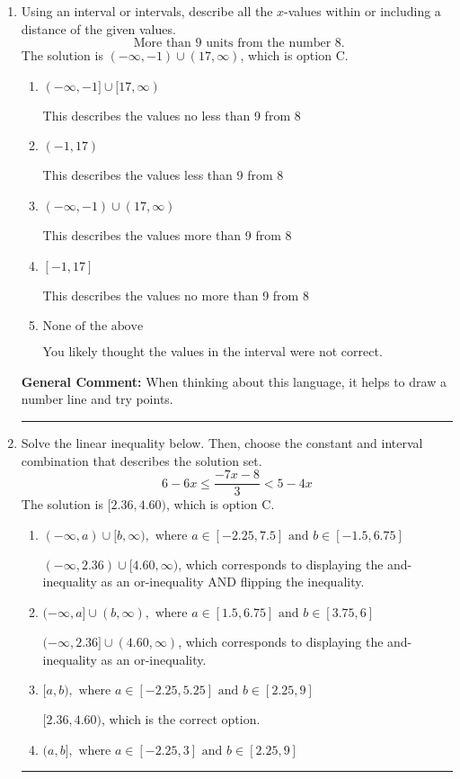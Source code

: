 \documentclass{extbook}[14pt]
\newcommand{\litem}[1]{\item #1

\rule{\textwidth}{0.4pt}}
\begin{document}
\begin{enumerate}
{\textbf{General Comment:} When multiplying or dividing by a negative, flip the sign.
}
\litem{
Using an interval or intervals, describe all the $x$-values within or including a distance of the given values.
\[ \text{ More than } 9 \text{ units from the number } 8. \]The solution is \( (-\infty, -1) \cup (17, \infty) \), which is option C.\begin{enumerate}[label=\Alph*.]
\item \( (-\infty, -1] \cup [17, \infty) \)

This describes the values no less than 9 from 8
\item \( (-1, 17) \)

This describes the values less than 9 from 8
\item \( (-\infty, -1) \cup (17, \infty) \)

This describes the values more than 9 from 8
\item \( [-1, 17] \)

This describes the values no more than 9 from 8
\item \( \text{None of the above} \)

You likely thought the values in the interval were not correct.
\end{enumerate}

\textbf{General Comment:} When thinking about this language, it helps to draw a number line and try points.
}
\litem{
Solve the linear inequality below. Then, choose the constant and interval combination that describes the solution set.
\[ 6 - 6 x \leq \frac{-7 x - 8}{3} < 5 - 4 x \]The solution is \( [2.36, 4.60) \), which is option C.\begin{enumerate}[label=\Alph*.]
\item \( (-\infty, a) \cup [b, \infty), \text{ where } a \in [-2.25, 7.5] \text{ and } b \in [-1.5, 6.75] \)

$(-\infty, 2.36) \cup [4.60, \infty)$, which corresponds to displaying the and-inequality as an or-inequality AND flipping the inequality.
\item \( (-\infty, a] \cup (b, \infty), \text{ where } a \in [1.5, 6.75] \text{ and } b \in [3.75, 6] \)

$(-\infty, 2.36] \cup (4.60, \infty)$, which corresponds to displaying the and-inequality as an or-inequality.
\item \( [a, b), \text{ where } a \in [-2.25, 5.25] \text{ and } b \in [2.25, 9] \)

$[2.36, 4.60)$, which is the correct option.
\item \( (a, b], \text{ where } a \in [-2.25, 3] \text{ and } b \in [2.25, 9] \)


\end{enumerate}}
\end{enumerate}
\end{document}
